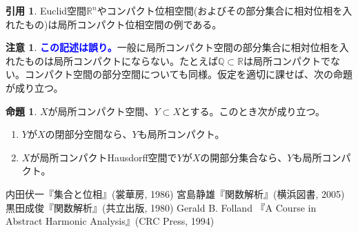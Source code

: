 \documentclass[12pt]{jsarticle}
\newcommand{\R}{\mathbb{R}}
\newcommand{\Q}{\mathbb{Q}}
\newcommand{\textblue}[1]{\textcolor{blue}{\textbf{#1}}}
\theoremstyle{definition}%
\newtheorem*{prop}{命題}
\newtheorem*{rem}{注意}
\newtheorem*{quo}{引用}%
\renewenvironment{leftbar}{%
  \renewcommand\FrameCommand{\vrule width 1pt \hspace{10pt}}%
  \MakeFramed {\advance\hsize-\width \FrameRestore}}%
 {\endMakeFramed}
\newcommand{\barquo}[1]{\begin{leftbar} \begin{quo}  #1 \end{quo} \end{leftbar}}
\begin{document}
\barquo{
Euclid空間$\R^n$やコンパクト位相空間(およびその部分集合に相対位相を入れたもの)は局所コンパクト位相空間の例である。
}
\begin{rem}
  \textblue{この記述は誤り。}一般に局所コンパクト空間の部分集合に相対位相を入れたものは局所コンパクトにならない。たとえば$\Q \subset \R$は局所コンパクトでない。コンパクト空間の部分空間についても同様。仮定を適切に課せば、次の命題が成り立つ。
\end{rem}
\begin{prop}
$X$が局所コンパクト空間、$Y \subset X$とする。このとき次が成り立つ。
\begin{enumerate}
  \item $Y$が$X$の閉部分空間なら、$Y$も局所コンパクト。
  \item $X$が局所コンパクトHausdorff空間で$Y$が$X$の開部分集合なら、$Y$も局所コンパクト。
\end{enumerate}
\end{prop}

\begin{thebibliography}{9}%
   内田伏一『集合と位相』(裳華房, 1986)
   宮島静雄『関数解析』(横浜図書, 2005)
   黒田成俊『関数解析』(共立出版, 1980)
   Gerald B. Folland 『A Course in Abstract Harmonic Analysis』(CRC Press, 1994)
\end{thebibliography}
\end{document}

